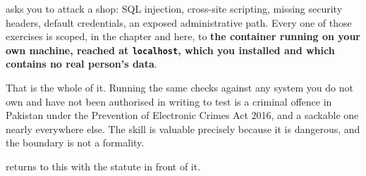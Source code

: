 \begin{alertbox}
 asks you to attack a shop: SQL injection, cross-site
scripting, missing security headers, default credentials, an exposed
administrative path. Every one of those exercises is scoped, in the chapter and
here, to \textbf{the container running on your own machine, reached at
\texttt{localhost}, which you installed and which contains no real person's
data}.

\smallskip
That is the whole of it. Running the same checks against any system you do not
own and have not been authorised in writing to test is a criminal offence in
Pakistan under the Prevention of Electronic Crimes Act 2016, and a sackable one
nearly everywhere else. The skill is valuable precisely because it is
dangerous, and the boundary is not a formality.

\smallskip
{} returns to this with the statute in front of it.
\end{alertbox}
